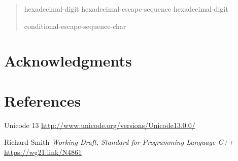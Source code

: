 \documentclass{wg21}
\begin{document}
\begin{quote}
        \begin{bnf}
            \br
             hexadecimal-digit\br
            hexadecimal-escape-sequence hexadecimal-digit\br
        \end{bnf}
        
        \begin{bnf}
            \br
            \terminal{\textbackslash} conditional-escape-sequence-char
        \end{bnf}
        
    \end{quote}
    
    \section{Acknowledgments}
    
    \section{References}
    \renewcommand{\section}[2]{}%
    
    
    
    \begin{thebibliography}{9}
        
        
        Unicode 13\newline
        \url{http://www.unicode.org/versions/Unicode13.0.0/}
        
        
        Richard Smith
        \emph{Working Draft, Standard for Programming Language C++}\newline
        \url{https://wg21.link/N4861}
        
    \end{thebibliography}
\end{document}

